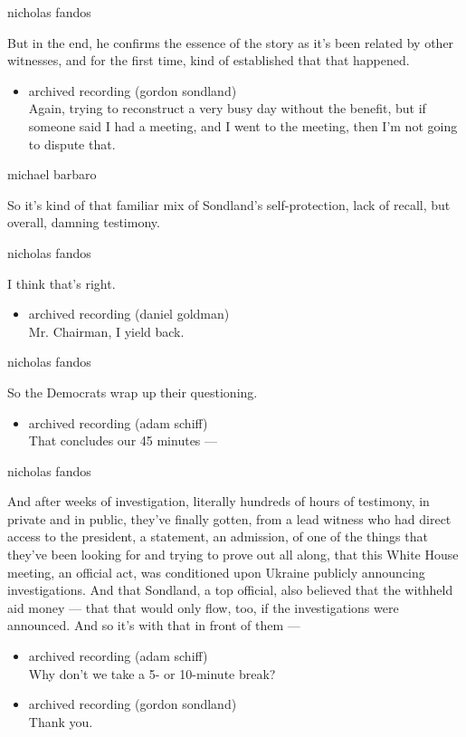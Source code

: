 nicholas fandos

But in the end, he confirms the essence of the story as it's been
related by other witnesses, and for the first time, kind of established
that that happened.

\begin{itemize}
\tightlist
\item
  archived recording (gordon sondland)\\
  Again, trying to reconstruct a very busy day without the benefit, but
  if someone said I had a meeting, and I went to the meeting, then I'm
  not going to dispute that.
\end{itemize}

michael barbaro

So it's kind of that familiar mix of Sondland's self-protection, lack of
recall, but overall, damning testimony.

nicholas fandos

I think that's right.

\begin{itemize}
\tightlist
\item
  archived recording (daniel goldman)\\
  Mr. Chairman, I yield back.
\end{itemize}

nicholas fandos

So the Democrats wrap up their questioning.

\begin{itemize}
\tightlist
\item
  archived recording (adam schiff)\\
  That concludes our 45 minutes ---
\end{itemize}

nicholas fandos

And after weeks of investigation, literally hundreds of hours of
testimony, in private and in public, they've finally gotten, from a lead
witness who had direct access to the president, a statement, an
admission, of one of the things that they've been looking for and trying
to prove out all along, that this White House meeting, an official act,
was conditioned upon Ukraine publicly announcing investigations. And
that Sondland, a top official, also believed that the withheld aid money
--- that that would only flow, too, if the investigations were
announced. And so it's with that in front of them ---

\begin{itemize}
\item
  archived recording (adam schiff)\\
  Why don't we take a 5- or 10-minute break?
\item
  archived recording (gordon sondland)\\
  Thank you.
\end{itemize}

